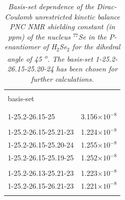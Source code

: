 \documentclass[a4paper,12pt,english]{article}
\begin{document}
\begin{table}[h!]
  \begin{center}
    \caption{
    \label{Sebas}
    \emph{
Basis-set dependence of the Dirac-Coulomb unrestricted kinetic balance
PNC NMR shielding constant (in ppm)
of the nucleus $^{77}$Se
in the P-enantiomer of H$_2$Se$_2$
for the dihedral angle of 45 \textsuperscript{o}.
The basis-set 1-25.2-26.15-25.20-24 has been chosen for further calculations.
    }}
    \begin{tabular}{lr}
      \\
      \hline\hline
      \\
      basis-set\\
      \\
      \hline
      \\
      1-25.2-26.15-25      & 3.156$\times 10^{-8}$\\
      \\
      1-25.2-26.15-25.21-23& 1.224$\times 10^{-8}$\\
      1-25.2-26.15-25.20-24& 1.255$\times 10^{-8}$\\
      1-25.2-26.15-25.19-25& 1.252$\times 10^{-8}$\\
      \\
      1-25.2-26.13-25.21-23& 1.223$\times 10^{-8}$\\
      1-25.2-26.15-26.21-23& 1.221$\times 10^{-8}$\\
      \\
      \hline\hline
    \end{tabular}
  \end{center}
\end{table}
\end{document}

